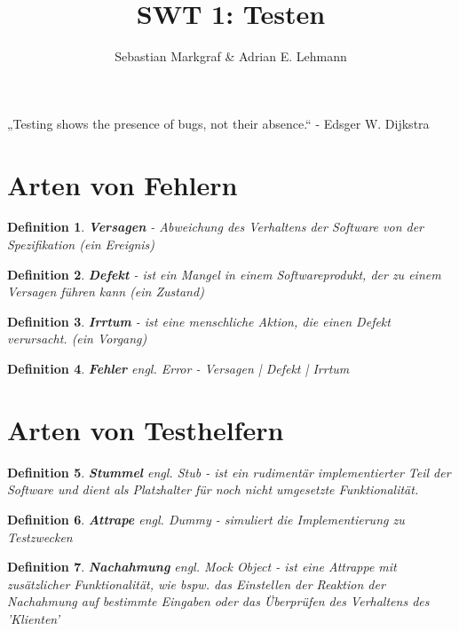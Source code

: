 \documentclass[a4paper]{article}
\title{SWT 1: Testen}
\author{Sebastian Markgraf \& Adrian E. Lehmann}
\theoremstyle{break}
\newtheorem{defi}{Definition}[section]
\begin{document}
	\maketitle
	\begin{large}
	\begin{center} „Testing shows the presence of bugs, not their absence.“\newline
		- Edsger W. Dijkstra
	\end{center}
	\end{large}
	\tableofcontents
	\newpage
        \section{Arten von Fehlern}
        \begin{defi}
          \textbf{Versagen} - Abweichung des Verhaltens der Software von der Spezifikation (ein Ereignis)
        \end {defi}
        \begin{defi}
          \textbf{Defekt} - ist ein Mangel in einem Softwareprodukt, der zu einem Versagen führen kann (ein Zustand)
        \end{defi}
        \begin{defi}
          \textbf{Irrtum} - ist eine menschliche Aktion, die einen Defekt verursacht. (ein Vorgang)
        \end{defi}
        \begin{defi}
          \textbf{Fehler} \textit{engl. Error} - Versagen | Defekt | Irrtum
        \end{defi}
        
        \section{Arten von Testhelfern}
        \begin{defi}
          \textbf{Stummel} \textit{engl. Stub} - ist ein rudimentär implementierter Teil der Software und dient als Platzhalter für noch nicht umgesetzte Funktionalität.
        \end{defi}
        \begin{defi}
          \textbf{Attrape} \textit{engl. Dummy} - simuliert die Implementierung zu Testzwecken
        \end{defi}
        \begin{defi}
          \textbf{Nachahmung} \textit{engl. Mock Object} - ist eine Attrappe mit zusätzlicher Funktionalität, wie bspw. das Einstellen der Reaktion der Nachahmung auf bestimmte Eingaben oder das Überprüfen des Verhaltens des 'Klienten'
        \end{defi}
        
\end{document}
